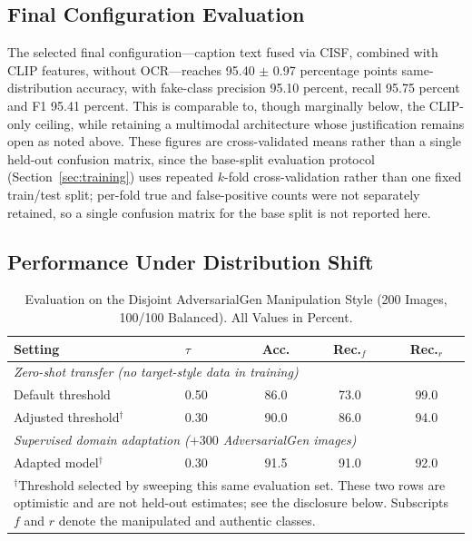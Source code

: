 \documentclass[conference,a4paper]{IEEEtran}
\begin{document}
\subsection{Final Configuration Evaluation}

The selected final configuration---caption text fused via CISF, combined with
CLIP features, without OCR---reaches 95.40 $\pm$ 0.97 percentage points
same-distribution accuracy, with fake-class precision 95.10 percent, recall
95.75 percent and F1 95.41 percent. This is comparable to, though marginally
below, the CLIP-only ceiling, while retaining a multimodal architecture whose
justification remains open as noted above. These figures are cross-validated
means rather than a single held-out confusion matrix, since the base-split
evaluation protocol (Section~\ref{sec:training}) uses repeated $k$-fold
cross-validation rather than one fixed train/test split; per-fold true and
false-positive counts were not separately retained, so a single confusion
matrix for the base split is not reported here.

\subsection{Performance Under Distribution Shift}
\label{sec:shift}

\begin{table}[t]
\caption{Evaluation on the Disjoint AdversarialGen Manipulation Style
(200 Images, 100/100 Balanced). All Values in Percent.}
\label{tab:shift}
\centering
\setlength{\tabcolsep}{3pt}
\begin{tabular}{llccc}
\toprule
\textbf{Setting} & \textbf{$\tau$} & \textbf{Acc.} &
\textbf{Rec.$_{f}$} & \textbf{Rec.$_{r}$} \\
\midrule
\multicolumn{5}{l}{\emph{Zero-shot transfer (no target-style data in training)}} \\
Default threshold              & 0.50 & 86.0 & 73.0 & 99.0 \\
Adjusted threshold$^{\dagger}$ & 0.30 & 90.0 & 86.0 & 94.0 \\
\midrule
\multicolumn{5}{l}{\emph{Supervised domain adaptation ($+300$ AdversarialGen images)}} \\
Adapted model$^{\dagger}$      & 0.30 & 91.5 & 91.0 & 92.0 \\
\bottomrule
\multicolumn{5}{p{0.92\columnwidth}}{\footnotesize $^{\dagger}$Threshold
selected by sweeping this same evaluation set. These two rows are optimistic
and are not held-out estimates; see the disclosure below. Subscripts $f$ and
$r$ denote the manipulated and authentic classes.}
\end{tabular}
\end{table}
\end{document}
